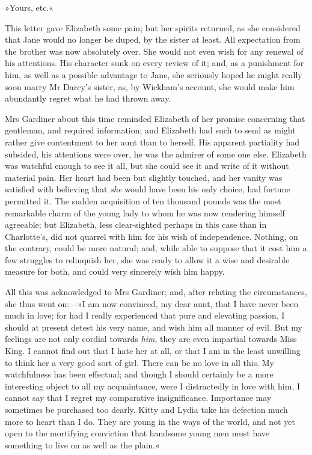 »Yours, etc.«

This letter gave Elizabeth some pain; but her spirits returned, as she considered that Jane would no longer be duped, by the sister at least. All expectation from the brother was now absolutely over. She would not even wish for any renewal of his attentions. His character sunk on every review of it; and, as a punishment for him, as well as a possible advantage to Jane, she seriously hoped he might really soon marry Mr Darcy's sister, as, by Wickham's account, she would make him abundantly regret what he had thrown away.

Mrs Gardiner about this time reminded Elizabeth of her promise concerning that gentleman, and required information; and Elizabeth had such to send as might rather give contentment to her aunt than to herself. His apparent partiality had subsided, his attentions were over, he was the admirer of some one else. Elizabeth was watchful enough to see it all, but she could see it and write of it without material pain. Her heart had been but slightly touched, and her vanity was satisfied with believing that \textit{she} would have been his only choice, had fortune permitted it. The sudden acquisition of ten thousand pounds was the most remarkable charm of the young lady to whom he was now rendering himself agreeable; but Elizabeth, less clear-sighted perhaps in this case than in Charlotte's, did not quarrel with him for his wish of independence. Nothing, on the contrary, could be more natural; and, while able to suppose that it cost him a few struggles to relinquish her, she was ready to allow it a wise and desirable measure for both, and could very sincerely wish him happy.

All this was acknowledged to Mrs Gardiner; and, after relating the circumstances, she thus went on:—»I am now convinced, my dear aunt, that I have never been much in love; for had I really experienced that pure and elevating passion, I should at present detest his very name, and wish him all manner of evil. But my feelings are not only cordial towards \textit{him}, they are even impartial towards Miss King. I cannot find out that I hate her at all, or that I am in the least unwilling to think her a very good sort of girl. There can be no love in all this. My watchfulness has been effectual; and though I should certainly be a more interesting object to all my acquaintance, were I distractedly in love with him, I cannot say that I regret my comparative insignificance. Importance may sometimes be purchased too dearly. Kitty and Lydia take his defection much more to heart than I do. They are young in the ways of the world, and not yet open to the mortifying conviction that handsome young men must have something to live on as well as the plain.«